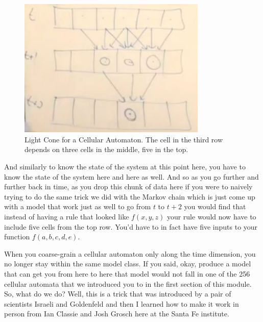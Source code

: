 \documentclass[]{article}
\begin{document}
\begin{figure}[H]
	\begin{center}
		\caption[Light Cone for a Cellular Automaton]{Light Cone for a Cellular Automaton. The cell in the third row depends on three cells in the middle, five in the top.}
		\includegraphics[width=0.8\textwidth]{cellular-automaton-light-cone}
	\end{center}
\end{figure}

And similarly to know the state of the system at this point here, you have to know the state of the system here and here as well.
And so as you go further and further back in time, as you drop this chunk of data here if you were to naively trying to do the same trick we did with the Markov chain
which is just come up with a model that work just as well to go from $t$ to $t+2$ you would find that instead of having a rule that looked like $f(x,y,z)$ your rule would now have to include five cells from the top row.
You'd have to in fact have five inputs to your function $f(a,b,c,d,e)$.

When you coarse-grain a cellular automaton only along the time dimension, you no longer stay within the same model class.
If you said, okay, produce a model
that can get you from here to here
that model would not fall
in one of the 256 cellular automata
that we introduced you to
in the first section of this module.
So, what do we do? Well, this is a trick
that was introduced
by a pair of scientists
Israeli and Goldenfeld
and then I learned how to make it work
in person from Ian Classie and Josh Grosch here
at the Santa Fe institute.
\end{document}

